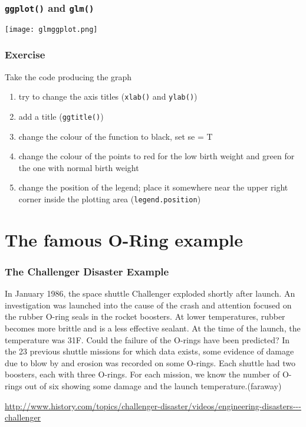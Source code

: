 \begin{frame}\frametitle{\texttt{ggplot()} and \texttt{glm()}}
  \begin{center}
    \texttt{[image: glmggplot.png]}
  \end{center}
\end{frame}


\begin{frame}[fragile]\frametitle{Exercise}
Take the code producing the graph
  \begin{enumerate}
  \item try to change the axis titles (\texttt{xlab()} and \texttt{ylab()})
  \item add a title (\texttt{ggtitle()})
  \item change the colour of the function to black, set se = T
  \item change the colour of the points to red for the low birth weight and green for the one with normal birth weight
  \item change the position of the legend; place it somewhere near the upper right corner inside the plotting area (\texttt{legend.position})
  \end{enumerate}
\end{frame}

\section{The famous O-Ring example}

\begin{frame}[fragile]\frametitle{The Challenger Disaster Example}
In January 1986, the space shuttle Challenger exploded shortly after launch. An
investigation was launched into the cause of the crash and attention focused on the rubber
O-ring seals in the rocket boosters. At lower temperatures, rubber becomes more brittle
and is a less effective sealant. At the time of the launch, the temperature was 31\degree F. Could
the failure of the O-rings have been predicted? In the 23 previous shuttle missions for
which data exists, some evidence of damage due to blow by and erosion was recorded on
some O-rings. Each shuttle had two boosters, each with three O-rings. For each mission,
we know the number of O-rings out of six showing some damage and the launch
temperature.(faraway)

\url{http://www.history.com/topics/challenger-disaster/videos/engineering-disasters---challenger}

\end{frame}

